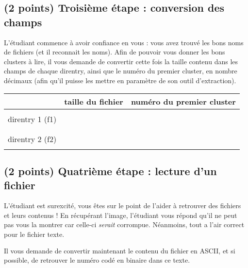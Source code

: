 \documentclass[11pt,a4paper]{article}
\begin{document}

\newpage

\subsection{(2 points) Troisième étape : conversion des champs }

L'étudiant commence à avoir confiance en vous : vous avez trouvé les bons noms de fichiers (et il reconnait les noms).
Afin de pouvoir vous donner les bons clusters à lire, il vous demande de convertir cette fois la taille contenu dans les champs de chaque direntry, ainsi que le numéro du premier cluster, en nombre décimaux (afin qu'il puisse les mettre en paramètre de son outil d'extraction).

\smallskip

\begin{center}
\begin{tabular}{ | c | C{5cm} | C{7.5cm} | }
\hline
 & taille du fichier & numéro du premier cluster \\
\hline
 & & \\
direntry 1 (f1) & & \\
 & & \\
\hline
 & & \\
direntry 2 (f2) & & \\
 & & \\
\hline
\end{tabular}
\end{center}

\smallskip

\subsection{(2 points) Quatrième étape : lecture d'un fichier }

L'étudiant est surexcité, vous êtes sur le point de l'aider à retrouver des fichiers et leurs contenus !
En récupérant l'image, l'étudiant vous répond qu'il ne peut pas vous la montrer car celle-ci \textit{serait} corrompue.
Néanmoins, tout a l'air correct pour le fichier texte.

\smallskip

Il vous demande de convertir maintenant le contenu du fichier en ASCII, et si possible, de retrouver le numéro codé en binaire dans ce texte.
\end{document}
